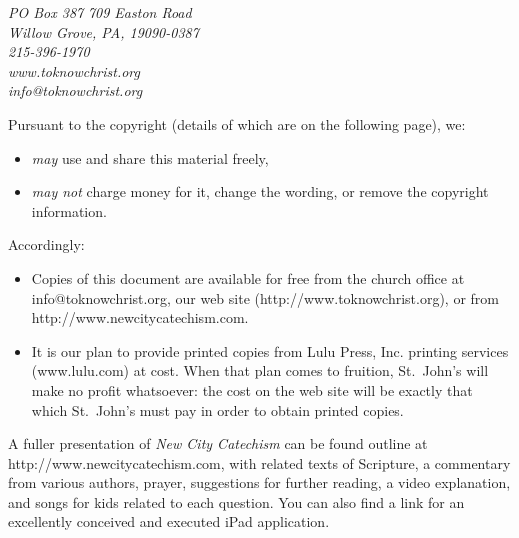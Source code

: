\documentclass[00-main.tex]{subfiles}
\begin{document}
\vspace{-1em}

\begin{center}
\emph{PO Box 387\,\textbullet\,709 Easton Road\\
Willow Grove, PA, 19090-0387\\
215-396-1970\\
www.toknowchrist.org\\
info@toknowchrist.org}
\end{center}

Pursuant to the copyright (details of which are on the following page), we:

\begin{itemize}
	\item {\em may}\/ use and share this material freely,
	\item {\em may not}\/ charge money for it, change the wording, or remove the copyright information.
\end{itemize}

Accordingly:

\begin{itemize}
	\item Copies of this document are available for free from the church office at info@to\hspace{0em}know\hspace{0em}christ.\hspace{0em}org, our web site (http:\slash{}\slash{}www.to\hspace{0em}know\hspace{0em}christ.org), or from http:\slash{}\slash{}www.new\hspace{0em}city\hspace{0em}cate\hspace{0em}chism.\hspace{0em}com.
	\item It is our plan to provide printed copies from Lulu Press, Inc. printing services (www.lulu.com) at cost. When that plan comes to fruition, St.\ John's will make no profit whatsoever: the cost on the web site will be exactly that which St.\ John's must pay in order to obtain printed copies.
\end{itemize}

A fuller presentation of {\em New City Catechism}\/ can be found outline at http:\slash{}\slash{}www.new\hspace{0em}city\hspace{0em}cat\hspace{0em}echism.\hspace{0em}com, with related texts of Scripture, a commentary from various authors, prayer, suggestions for further reading, a video explanation, and songs for kids related to each question. You can also find a link for an excellently conceived and executed iPad application.
\end{document}

